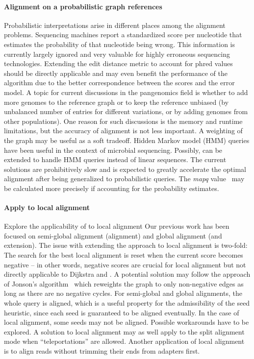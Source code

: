 \paragraph{Alignment on a probabilistic graph references}
Probabilistic interpretations arise in different places among the alignment
problems. Sequencing machines report a standardized score per nucleotide that
estimates the probability of that nucleotide being wrong. This information is
currently largely ignored and very valuable for highly erroneous sequencing
technologies. Extending the edit distance metric to account for phred values
should be directly applicable and may even benefit the performance of the \A
algorithm due to the better correspondence between the scores and the error
model. A topic for current discussions in the pangenomics field is whether to
add more genomes to the reference graph or to keep the reference unbiased (by
unbalanced number of entries for different variations, or by adding genomes from
other populations). One reason for such discussions is the memory and runtime
limitations, but the accuracy of alignment is not less important. A weighting of
the graph may be useful as a soft tradeoff. Hidden Markov model (HMM) queries
have been useful in the context of microbial sequencing. Possibly, \A can be
extended to handle HMM queries instead of linear sequences. The current
solutions are prohibitively slow and \astarix is expected to greatly accelerate
the optimal alignment after being generalized to probabilistic queries. The
\textit{mapq} value~\citep{li2008mapping} may be calculated more precisely if
accounting for the probability estimates.

\paragraph{Apply \A to local alignment}
Explore the applicability of \A to local alignment Our previous work has been
focused on semi-global alignment (alignment) and global alignment (and
extension). The issue with extending the \A approach to local alignment is
two-fold: The search for the best local alignment is reset when the current
score becomes negative – in other words, negative scores are crucial for local
alignment but not directly applicable to Dijkstra and \A. A potential solution
may follow the approach of Jonson's algorithm~\citep{johnson1977efficient} which
reweights the graph to only non-negative edges as long as there are no negative
cycles. For semi-global and global alignments, the whole query is aligned, which
is a useful property for the admissibility of the seed heuristic, since each
seed is guaranteed to be aligned eventually. In the case of local alignment,
some seeds may not be aligned. Possible workarounds have to be explored. A
solution to local alignment may as well apply to the split alignment mode when
``teleportations'' are allowed. Another application of local alignment is to
align reads without trimming their ends from adapters first.

